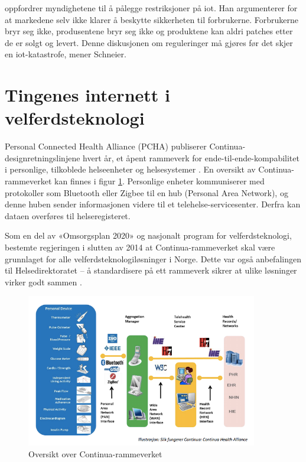 \citet{iot_schneier_regulation} oppfordrer myndighetene til å pålegge restriksjoner på \gls{iot}.
Han argumenterer for at markedene selv ikke klarer å beskytte sikkerheten til forbrukerne.
Forbrukerne bryr seg ikke, produsentene bryr seg ikke og produktene kan aldri patches
etter de er solgt og levert. Denne diskusjonen om reguleringer må gjøres før det skjer
en \gls{iot}-katastrofe, mener Schneier. %


\section{Tingenes internett i velferdsteknologi}
Personal Connected Health Alliance (PCHA) publiserer Continua-designretningslinjene hvert år,
et åpent rammeverk for ende-til-ende-kompabilitet i personlige, tilkoblede helseenheter og helsesystemer \citep{continua_guidelines}.
En oversikt av Continua-rammeverket kan finnes i figur \ref{fig:continua}. Personlige enheter kommuniserer med
protokoller som Bluetooth eller Zigbee til en hub (Personal Area Network), og denne huben sender informasjonen
videre til et telehelse-servicesenter. Derfra kan dataen overføres til helseregisteret.

Som en del av «Omsorgsplan 2020» og nasjonalt program for velferdsteknologi, bestemte regjeringen
i slutten av 2014 at Continua-rammeverket skal være grunnlaget for alle velferdsteknologiløsninger i Norge.
Dette var også anbefalingen til Helsedirektoratet --
å standardisere på ett rammeverk sikrer at ulike løsninger virker godt sammen \citep{regjeringen_continua}.

\begin{figure}
\includegraphics[width=0.9\textwidth,center]{fig/continua}
\caption{Oversikt over Continua-rammeverket}
\label{fig:continua}
\end{figure}
